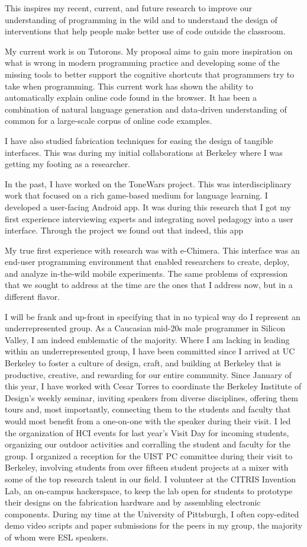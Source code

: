 \documentclass[12pt]{memoir}
\begin{document}
This inspires my recent, current, and future research to improve our understanding of programming in the wild and to understand the design of interventions that help people make better use of code outside the classroom.

My current work is on Tutorons.
My proposal aims to gain more inspiration on what is wrong in modern programming practice and developing some of the missing tools to better support the cognitive shortcuts that programmers try to take when programming.
This current work has shown the ability to automatically explain online code found in the browser.
It has been a combination of natural language generation and data-driven understanding of common for a large-scale corpus of online code examples.

I have also studied fabrication techniques for easing the design of tangible interfaces.
This was during my initial collaborations at Berkeley where I was getting my footing as a researcher.

In the past, I have worked on the ToneWars project.
This was interdisciplinary work that focused on a rich game-based medium for language learning.
I developed a user-facing Android app.
It was during this research that I got my first experience interviewing experts and integrating novel pedagogy into a user interface.
Through the project we found out that indeed, this app

My true first experience with research was with e-Chimera.
This interface was an end-user programming environment that enabled researchers to create, deploy, and analyze in-the-wild mobile experiments.
The same problems of expression that we sought to address at the time are the ones that I address now, but in a different flavor.

I will be frank and up-front in specifying that in no typical way do I represent an underrepresented group.
As a Caucasian mid-20s male programmer in Silicon Valley, I am indeed emblematic of the majority.
Where I am lacking in leading within an underrepresented group, I have been committed since I arrived at UC Berkeley to foster a culture of design, craft, and building at Berkeley that is productive, creative, and rewarding for our entire community.
Since January of this year, I have worked with Cesar Torres to coordinate the Berkeley Institute of Design's weekly seminar, inviting speakers from diverse disciplines, offering them tours and, most importantly, connecting them to the students and faculty that would most benefit from a one-on-one with the speaker during their visit.
I led the organization of HCI events for last year's Visit Day for incoming students, organizing our outdoor activities and corralling the student and faculty for the group.
I organized a reception for the UIST PC committee during their visit to Berkeley, involving students from over fifteen student projects at a mixer with some of the top research talent in our field.
I volunteer at the CITRIS Invention Lab, an on-campus hackerspace, to keep the lab open for students to prototype their designs on the fabrication hardware and by assembling electronic components.
During my time at the University of Pittsburgh, I often copy-edited demo video scripts and paper submissions for the peers in my group, the majority of whom were ESL speakers.
\end{document}
